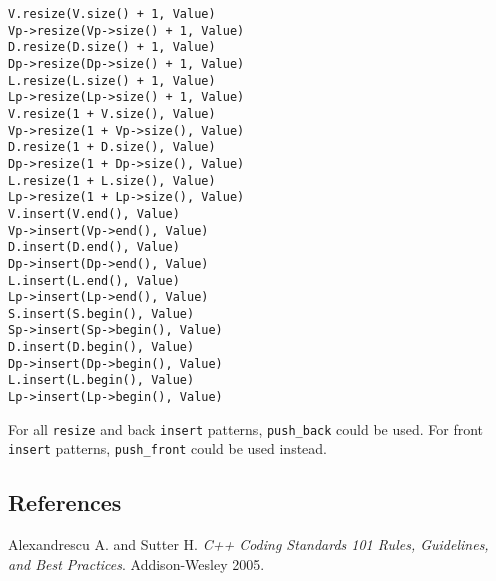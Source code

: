 \begin{verbatim}
V.resize(V.size() + 1, Value)
Vp->resize(Vp->size() + 1, Value)
D.resize(D.size() + 1, Value)
Dp->resize(Dp->size() + 1, Value)
L.resize(L.size() + 1, Value)
Lp->resize(Lp->size() + 1, Value)
V.resize(1 + V.size(), Value)
Vp->resize(1 + Vp->size(), Value)
D.resize(1 + D.size(), Value)
Dp->resize(1 + Dp->size(), Value)
L.resize(1 + L.size(), Value)
Lp->resize(1 + Lp->size(), Value)
V.insert(V.end(), Value)
Vp->insert(Vp->end(), Value)
D.insert(D.end(), Value)
Dp->insert(Dp->end(), Value)
L.insert(L.end(), Value)
Lp->insert(Lp->end(), Value)
S.insert(S.begin(), Value)
Sp->insert(Sp->begin(), Value)
D.insert(D.begin(), Value)
Dp->insert(Dp->begin(), Value)
L.insert(L.begin(), Value)
Lp->insert(Lp->begin(), Value)
\end{verbatim}

For all \texttt{resize} and back \texttt{insert} patterns, \texttt{push\_back}
could be used. For front \texttt{insert} patterns, \texttt{push\_front} could
be used instead.

\subsection{References}

Alexandrescu A. and Sutter H. {\it C++ Coding Standards 101 Rules, Guidelines, and Best Practices}. Addison-Wesley 2005.